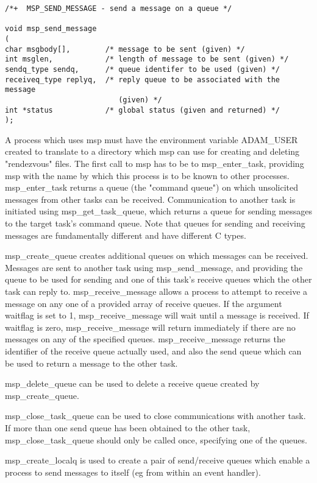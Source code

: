 \begin{verbatim}
/*+  MSP_SEND_MESSAGE - send a message on a queue */

void msp_send_message
(
char msgbody[],        /* message to be sent (given) */
int msglen,            /* length of message to be sent (given) */
sendq_type sendq,      /* queue identifer to be used (given) */
receiveq_type replyq,  /* reply queue to be associated with the message
                          (given) */
int *status            /* global status (given and returned) */
);

\end{verbatim}

A process which uses msp must have the environment variable ADAM\_USER
created to translate to a directory which msp can use for creating and
deleting "rendezvous" files. The first call to msp has to be to
msp\_enter\_task, providing msp with the name by which this process is to
be known to other processes. msp\_enter\_task returns a queue (the "command
queue") on which unsolicited messages from other tasks can be received.
Communication to another task is initiated using msp\_get\_task\_queue,
which returns a queue for sending messages to the target task's command
queue. Note that queues for sending and receiving messages are
fundamentally different and have different C types.

msp\_create\_queue creates additional queues on which messages can be
received. Messages are sent to another task using msp\_send\_message, and
providing the queue to be used for sending and one of this task's receive
queues which the other task can reply to. msp\_receive\_message allows a
process to attempt to receive a message on any one of a provided array of
receive queues. If the argument waitflag is set to 1, msp\_receive\_message
will wait until a message is received. If waitflag is zero,
msp\_receive\_message will return immediately if there are no messages on
any of the specified queues. msp\_receive\_message returns the identifier
of the receive queue actually used, and also the send queue which can be
used to return a message to the other task.

msp\_delete\_queue can be used to delete a receive queue created by
msp\_create\_queue.

msp\_close\_task\_queue can be used to close communications with another
task. If more than one send queue has been obtained to the other task,
msp\_close\_task\_queue should only be called once, specifying one of the
queues.

msp\_create\_localq is used to create a pair of send/receive queues which
enable a process to send messages to itself (eg from within an event
handler).



